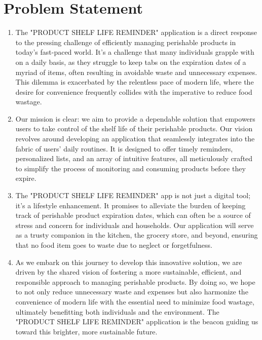 \section{Problem Statement}
\begin{enumerate}
\item[] The "PRODUCT SHELF LIFE REMINDER" application is a direct response to the pressing challenge of efficiently managing perishable products in today's fast-paced world. It's a challenge that many individuals grapple with on a daily basis, as they struggle to keep tabs on the expiration dates of a myriad of items, often resulting in avoidable waste and unnecessary expenses. This dilemma is exacerbated by the relentless pace of modern life, where the desire for convenience frequently collides with the imperative to reduce food wastage.
\item[] \hspace{1cm}Our mission is clear: we aim to provide a dependable solution that empowers users to take control of the shelf life of their perishable products. Our vision revolves around developing an application that seamlessly integrates into the fabric of users' daily routines. It is designed to offer timely reminders, personalized lists, and an array of intuitive features, all meticulously crafted to simplify the process of monitoring and consuming products before they expire.
\item[] \hspace{1cm}The "PRODUCT SHELF LIFE REMINDER" app is not just a digital tool; it's a lifestyle enhancement. It promises to alleviate the burden of keeping track of perishable product expiration dates, which can often be a source of stress and concern for individuals and households. Our application will serve as a trusty companion in the kitchen, the grocery store, and beyond, ensuring that no food item goes to waste due to neglect or forgetfulness.
\item[] \hspace{1cm}As we embark on this journey to develop this innovative solution, we are driven by the shared vision of fostering a more sustainable, efficient, and responsible approach to managing perishable products. By doing so, we hope to not only reduce unnecessary waste and expenses but also harmonize the convenience of modern life with the essential need to minimize food wastage, ultimately benefitting both individuals and the environment. The "PRODUCT SHELF LIFE REMINDER" application is the beacon guiding us toward this brighter, more sustainable future.
\end{enumerate}

